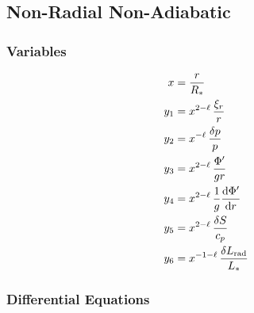 \documentclass[fleqn]{article}
\newcommand{\diff}{\ensuremath{\mathrm{d}}}
\newcommand{\Rstar}{\ensuremath{R_{\ast}}}
\newcommand{\Lrad}{\ensuremath{L_{\rm rad}}}
\newcommand{\Lstar}{\ensuremath{L_{\ast}}}
\begin{document}



\newpage

\subsection*{Non-Radial Non-Adiabatic}

\subsubsection*{Variables}

\begin{align*}
x     &= \frac{r}{\Rstar} \\
y_{1} &= x^{2-\ell}\, \frac{\xi_{r}}{r} \\
y_{2} &= x^{ -\ell}\, \frac{\delta p}{p} \\
y_{3} &= x^{2-\ell}\, \frac{\Phi'}{gr} \\
y_{4} &= x^{2-\ell}\, \frac{1}{g} \frac{\diff \Phi'}{\diff r} \\
y_{5} &= x^{2-\ell}\, \frac{\delta S}{c_{p}}\\
y_{6} &= x^{-1-\ell}\, \frac{\delta \Lrad}{\Lstar}
\end{align*}

\subsubsection*{Differential Equations}
\end{document}
